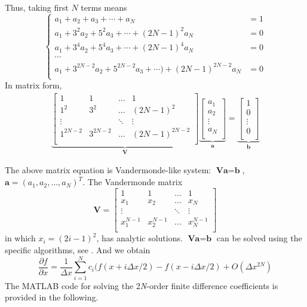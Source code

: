 Thus, taking first $N$ terms means
\begin{equation}
\left\{
\begin{split}
a_1+a_2+a_3+\cdots+a_N&=1\\
a_1+3^2a_2+5^2a_3+\cdots+(2N-1)^2a_N&=0\\
a_1+3^4a_2+5^4a_3+\cdots+(2N-1)^4a_N&=0\\
\cdots	&\\
a_1+3^{2N-2}a_2+5^{2N-2}a_3+\cdots)+(2N-1)^{2N-2}a_N&=0\\
\end{split}
\right.
\end{equation}
In matrix form,
\begin{gather}
\underbrace{
\begin{bmatrix}
	1 & 1 & \ldots & 1\\
	1^2 & 3^2 & \ldots & (2N-1)^2\\
	\vdots & 	&	\ddots	& \vdots	\\
	1^{2N-2} & 3^{2N-2} & \ldots & (2N-1)^{2N-2}\\
\end{bmatrix}
}_{\textbf{V}}
\underbrace{
\begin{bmatrix}
a_1\\
a_2\\
\vdots\\
a_N\\
\end{bmatrix}
}_{\textbf{a}}=
\underbrace{
\begin{bmatrix}
1\\
0\\
\vdots\\
0\\
\end{bmatrix}
}_{\textbf{b}}
\end{gather}

The above matrix equation is Vandermonde-like system: $\textbf{V} \textbf{a}=\textbf{b}$, $\textbf{a}=(a_1, a_2,\ldots, a_N)^T$. The Vandermonde matrix
\begin{equation}
\textbf{V} =
\begin{bmatrix}
1 & 1 & \ldots & 1\\
x_1 & x_2 & \ldots & x_{N}\\
\vdots &  & \ddots & \vdots\\
x_1^{N-1} & x_2^{N-1} & \ldots & x_N^{N-1}\\
\end{bmatrix}
\end{equation}
in which $x_i=(2i-1)^2$, has analytic solutions. $\textbf{V} \textbf{a}=\textbf{b}$ can be solved using the specific algorithms, see \cite{bjorck1996numerical}. And we obtain
\begin{equation}
\frac{\partial f}{\partial x}=\frac{1}{\Delta x}\sum_{i=1}^N c_i(f(x+i\Delta x/2)-f(x-i\Delta x/2)+O(\Delta x^{2N})
\end{equation}
The MATLAB code for solving the 2\textit{N}-order finite difference coefficients is provided in the following. 


